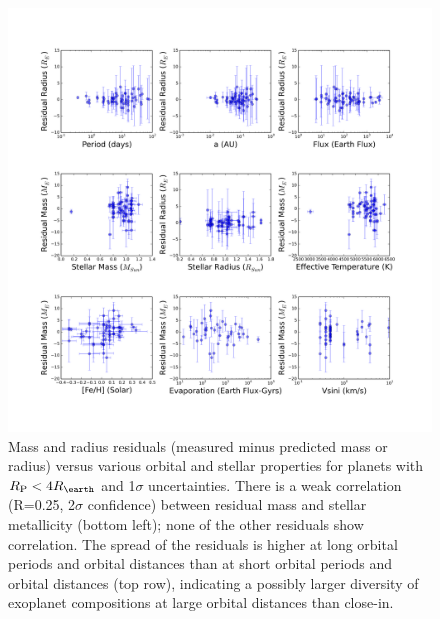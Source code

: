 \documentclass[iop]{emulateapj}
\newcommand{\rspecial}{4 \rearth}
\begin{document}
\begin{figure}[htbp] %
   \centering
    \includegraphics[width=6in]{mr_resids.png} 
   \caption{\small Mass and radius residuals (measured minus predicted mass or radius) versus various orbital and stellar properties for planets with $\rpl  < \rspecial$ and 1$\sigma$ uncertainties.  There is a weak correlation (R=0.25, 2$\sigma$ confidence) between residual mass and stellar metallicity (bottom left); none of the other residuals show correlation.  The spread of the residuals is higher at long orbital periods and orbital distances than at short orbital periods and orbital distances (top row), indicating a possibly larger diversity of exoplanet compositions at large orbital distances than close-in.}
   \label{fig:resids}
\end{figure}

\clearpage

{}

\end{document}

